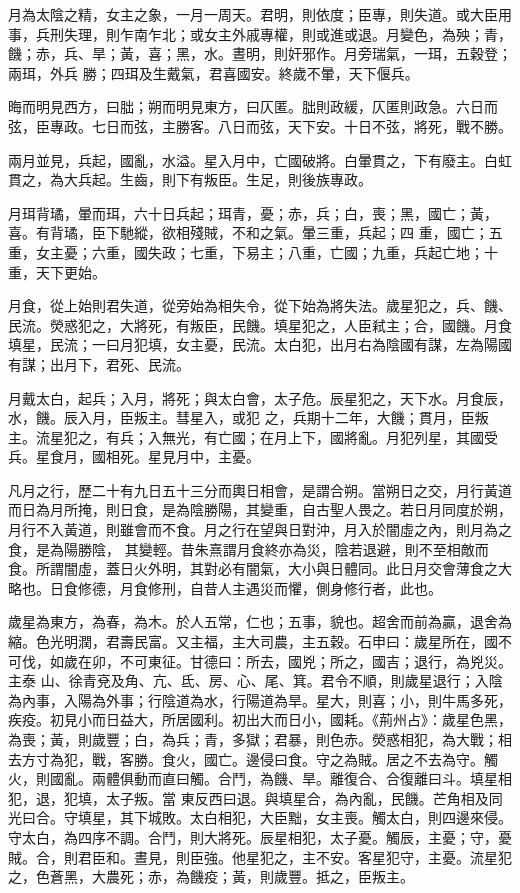 \begin{pinyinscope}
 月為太陰之精，女主之象，一月一周天。君明，則依度；臣專，則失道。或大臣用事，兵刑失理，則乍南乍北；或女主外戚專權，則或進或退。月變色，為殃；青，饑；赤，兵、旱；黃，喜；黑，水。晝明，則奸邪作。月旁瑞氣，一珥，五穀登；兩珥，外兵
 勝；四珥及生戴氣，君喜國安。終歲不暈，天下偃兵。



 晦而明見西方，曰朏；朔而明見東方，曰仄匿。朏則政緩，仄匿則政急。六日而弦，臣專政。七日而弦，主勝客。八日而弦，天下安。十日不弦，將死，戰不勝。



 兩月並見，兵起，國亂，水溢。星入月中，亡國破將。白暈貫之，下有廢主。白虹貫之，為大兵起。生齒，則下有叛臣。生足，則後族專政。



 月珥背璚，暈而珥，六十日兵起；珥青，憂；赤，兵；白，喪；黑，國亡；黃，喜。有背璚，臣下馳縱，欲相殘賊，不和之氣。暈三重，兵起；四
 重，國亡；五重，女主憂；六重，國失政；七重，下易主；八重，亡國；九重，兵起亡地；十重，天下更始。



 月食，從上始則君失道，從旁始為相失令，從下始為將失法。歲星犯之，兵、饑、民流。熒惑犯之，大將死，有叛臣，民饑。填星犯之，人臣弒主；合，國饑。月食填星，民流；一曰月犯填，女主憂，民流。太白犯，出月右為陰國有謀，左為陽國有謀；出月下，君死、民流。



 月戴太白，起兵；入月，將死；與太白會，太子危。辰星犯之，天下水。月食辰，水，饑。辰入月，臣叛主。彗星入，或犯
 之，兵期十二年，大饑；貫月，臣叛主。流星犯之，有兵；入無光，有亡國；在月上下，國將亂。月犯列星，其國受兵。星食月，國相死。星見月中，主憂。



 凡月之行，歷二十有九日五十三分而輿日相會，是謂合朔。當朔日之交，月行黃道而日為月所掩，則日食，是為陰勝陽，其變重，自古聖人畏之。若日月同度於朔，月行不入黃道，則雖會而不食。月之行在望與日對沖，月入於闇虛之內，則月為之食，是為陽勝陰，
 其變輕。昔朱熹謂月食終亦為災，陰若退避，則不至相敵而食。所謂闇虛，蓋日火外明，其對必有闇氣，大小與日體同。此日月交會薄食之大略也。日食修德，月食修刑，自昔人主遇災而懼，側身修行者，此也。



 歲星為東方，為春，為木。於人五常，仁也；五事，貌也。超舍而前為贏，退舍為縮。色光明潤，君壽民富。又主福，主大司農，主五穀。石申曰：歲星所在，國不可伐，如歲在卯，不可東征。甘德曰：所去，國兇；所之，國吉；退行，為兇災。主泰
 山、徐青兗及角、亢、氐、房、心、尾、箕。君令不順，則歲星退行；入陰為內事，入陽為外事；行陰道為水，行陽道為旱。星大，則喜；小，則牛馬多死，疾疫。初見小而日益大，所居國利。初出大而日小，國耗。《荊州占》：歲星色黑，為喪；黃，則歲豐；白，為兵；青，多獄；君暴，則色赤。熒惑相犯，為大戰；相去方寸為犯，戰，客勝。食火，國亡。邊侵曰食。守之為賊。居之不去為守。觸火，則國亂。兩體俱動而直曰觸。合鬥，為饑、旱。離復合、合復離曰斗。填星相犯，退，犯填，太子叛。當
 東反西曰退。與填星合，為內亂，民饑。芒角相及同光曰合。守填星，其下城敗。太白相犯，大臣黜，女主喪。觸太白，則四邊來侵。守太白，為四序不調。合鬥，則大將死。辰星相犯，太子憂。觸辰，主憂；守，憂賊。合，則君臣和。晝見，則臣強。他星犯之，主不安。客星犯守，主憂。流星犯之，色蒼黑，大農死；赤，為饑疫；黃，則歲豐。抵之，臣叛主。




\end{pinyinscope}
